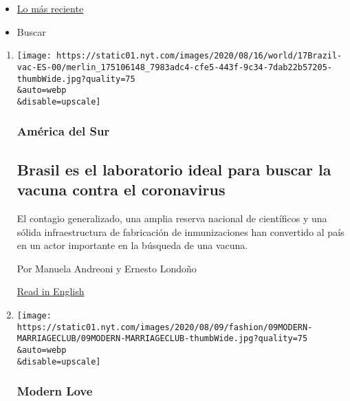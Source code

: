 \begin{itemize}
\tightlist
\item
  \protect\hyperlink{stream-panel}{Lo más reciente}
\item
  Buscar
\end{itemize}

\begin{enumerate}
\def\labelenumi{\arabic{enumi}.}
\item
  \href{/es/2020/08/17/espanol/america-latina/vacuna-coronavirus-brasil.html}{}

  \texttt{[image: https://static01.nyt.com/images/2020/08/16/world/17Brazil-vac-ES-00/merlin\_175106148\_7983adc4-cfe5-443f-9c34-7dab22b57205-thumbWide.jpg?quality=75\\\&auto=webp\\\&disable=upscale]}

  \hypertarget{amuxe9rica-del-sur}{%
  \subsubsection{América del Sur}\label{amuxe9rica-del-sur}}

  \hypertarget{brasil-es-el-laboratorio-ideal-para-buscar-la-vacuna-contra-el-coronavirus}{%
  \subsection{Brasil es el laboratorio ideal para buscar la vacuna
  contra el
  coronavirus}\label{brasil-es-el-laboratorio-ideal-para-buscar-la-vacuna-contra-el-coronavirus}}

  El contagio generalizado, una amplia reserva nacional de científicos y
  una sólida infraestructura de fabricación de inmunizaciones han
  convertido al país en un actor importante en la búsqueda de una
  vacuna.

  Por Manuela Andreoni y Ernesto Londoño

  \href{https://www.nytimes.com/2020/08/15/world/americas/brazil-coronavirus-vaccine.html}{Read
  in English}
\item
  \href{/es/2020/08/16/espanol/estilos-de-vida/soltera-amor.html}{}

  \texttt{[image: https://static01.nyt.com/images/2020/08/09/fashion/09MODERN-MARRIAGECLUB/09MODERN-MARRIAGECLUB-thumbWide.jpg?quality=75\\\&auto=webp\\\&disable=upscale]}

  \hypertarget{modern-love}{%
  \subsubsection{Modern Love}\label{modern-love}}


\end{enumerate}
